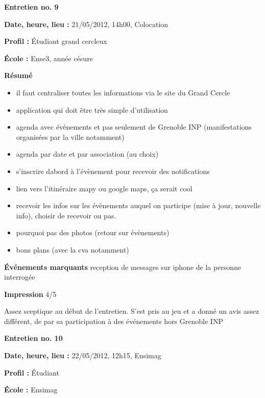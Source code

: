 \documentclass[a4paper, 11px]{article}
\begin{document}
 \textbf {\large Entretien no. 9}

\textbf{Date, heure, lieu : }
21/05/2012, 14h00, Colocation

\textbf{Profil : }
Étudiant grand cercleux

\textbf{École : }
Ense3, année césure

\textbf{Résumé}
	\begin{itemize}
		\item il faut centraliser toutes les informations via le site du Grand Cercle
		\item application qui doit être très simple d'utilisation
		\item agenda avec événements et pas seulement de Grenoble INP (manifestations organisées par la ville notamment)
		\item agenda par date et par association (au choix)
		\item s’inscrire dabord à l’évènement pour recevoir des notifications
		\item lien vers l’itinéraire mapy ou google maps, ça serait cool
		\item recevoir les infos sur les évènements auquel on participe (mise à jour, nouvelle
     info), choisir de recevoir ou pas.
		\item pourquoi pas des photos (retour sur évènements)
		\item bons plans (avec la cva notamment)

	\end{itemize}

\textbf{Événements marquants}
reception de messages sur iphone de la personne interrogée

\textbf{Impression}
4/5

Assez sceptique au début de l'entretien. S'est pris au jeu et a donné un avis assez différent, de par sa participation à des événements hors Grenoble INP



\vspace{.3cm}

 \textbf {\large Entretien no. 10}

\textbf{Date, heure, lieu : }
22/05/2012, 12h15, Ensimag

\textbf{Profil : }
Étudiant

\textbf{École : }
Ensimag
\end{document}
